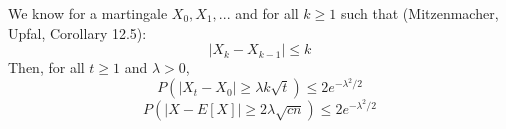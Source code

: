 \documentclass[letterpaper, 11pt]{article}
\begin{document}
We know for a martingale $X_0,X_1,...$ and for all $k \geq 1$ such that (Mitzenmacher, Upfal, Corollary 12.5):
$$|X_k-X_{k-1}| \leq k$$
Then, for all $t \geq 1$ and $\lambda > 0$,
$$P(|X_t-X_0| \geq \lambda k \sqrt{t}) \leq 2e^{- \lambda^2/2}$$
$$P(|X-E[X]| \geq 2\lambda\sqrt{cn}) \leq 2e^{-\lambda^2/2}$$
\end{document}

